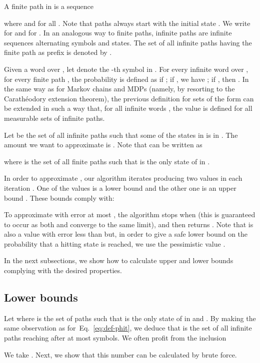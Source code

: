 \documentclass[final,3p,times,twocolumn]{elsarticle}
\theoremstyle{plain}
\theoremstyle{definition}
\newcommand{\recallEquation}[1]{Eq.~\ref{#1}}
\begin{document}
A finite path in  is a sequence

where  and 
for all . Note that paths always start with the initial state
. We write  for  and 
for . In an analogous way to finite paths, infinite paths
are infinite sequences alternating symbols and states. The set of all infinite
paths having the finite path  as prefix is denoted by
.

Given a word  over , let  denote the -th
symbol in . For every infinite word  over ,
for every finite path , the probability
 is defined as 
if ; if , we have
; if
, then
.
In the same way as for Markov chains and MDPs (namely, by resorting to the
Carath\'eodory extension theorem), the previous definition for sets of the form
 can be extended in such a way that, for all infinite
words , the value  is defined for all
measurable sets  of infinite paths.

Let  be the set of all infinite paths  such that
some of the states in  is in . The amount we want to
approximate is . Note that
 can be written as 

where  is the set of all finite paths  such that 
is the only state of  in .

In order to approximate , our algorithm iterates producing two
values in each iteration . One of the values is a lower bound 
and the other one is an upper bound . These bounds comply with:

To approximate  with error at most , the algorithm stops
when  (this is guaranteed to occur as
both  and  converge to the
same limit), and then returns . Note that  is also a
value with error less than  but, in order to give a safe lower bound
on the probability that a hitting state is reached, we use the pessimistic
value .

In the next subsections, we show how to calculate upper and lower bounds
complying with the desired properties.

\subsection{Lower bounds}

Let  where
 is the set of paths such that  is the only state
of  in  and . By making the
same observation as for~\recallEquation{eq:def-phit}, we deduce that
 is the set of all infinite paths reaching 
after at most  symbols. We often profit from the inclusion


We take .
Next, we show that this number can be calculated by brute force. 
\end{document}

